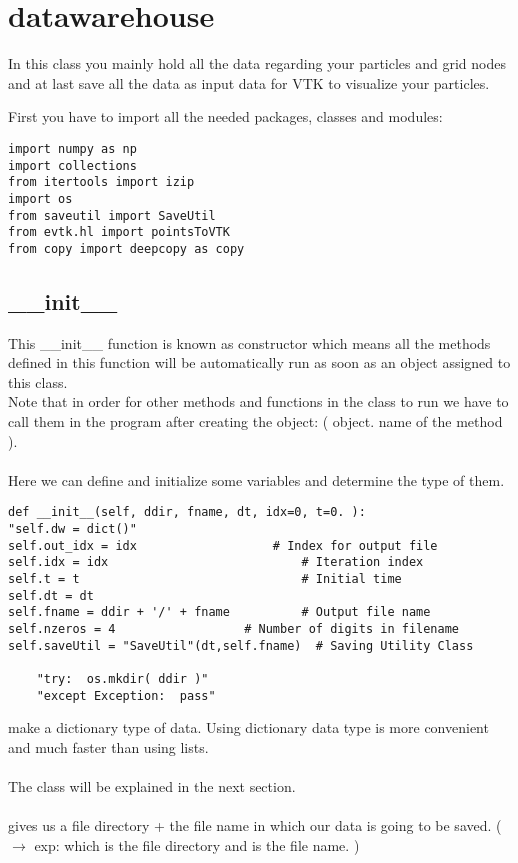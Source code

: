 \documentclass[11pt,fleqn]{book} %
\begin{document}
\chapter{datawarehouse}
\label{chap:datawarehouse}
In this class you mainly hold all the data regarding your particles and grid nodes and at last save all the data as input data for VTK to visualize your particles.

First you have to import all the needed packages, classes and modules:
\begin{lstlisting}
import numpy as np
import collections
from itertools import izip
import os
from saveutil import SaveUtil
from evtk.hl import pointsToVTK
from copy import deepcopy as copy
\end{lstlisting}
\section{\_\_init\_\_}
This \_\_init\_\_ function is known as constructor which means all the methods defined in this function will be automatically run as soon as an object assigned to this class. \\
Note that in order for other methods and functions in the class to run we have to call them in the program after creating the object: ( object. name of the method ). \\ \\
Here we can define and initialize some variables and determine the type of them. 
\begin{lstlisting}
def __init__(self, ddir, fname, dt, idx=0, t=0. ):
"self.dw = dict()"
self.out_idx = idx                   # Index for output file
self.idx = idx                           # Iteration index
self.t = t                               # Initial time
self.dt = dt
self.fname = ddir + '/' + fname          # Output file name
self.nzeros = 4                  # Number of digits in filename
self.saveUtil = "SaveUtil"(dt,self.fname)  # Saving Utility Class
	
	"try:  os.mkdir( ddir )"	    
	"except Exception:  pass"	
\end{lstlisting}
 make a dictionary type of data. Using dictionary data type is more convenient and much faster than using lists.\\ \\ 
The  class will be explained in the next section.\\ \\
 gives us a file directory + the file name in which our data is going to be saved. ( $\rightarrow$ exp:  which  is the file directory and  is the file name. )
\end{document}
